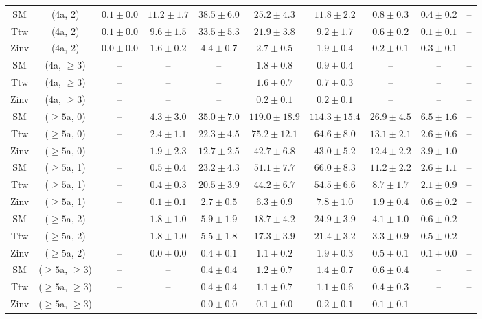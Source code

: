 \begin{table}[h!]
{\begin{tabular}{cccccccccc}
	SM & (4a, 2) & $0.1\pm 0.0$ & $11.2\pm 1.7$ & $38.5\pm 6.0$ & $25.2\pm 4.3$ & $11.8\pm 2.2$ & $0.8\pm 0.3$ & $0.4\pm 0.2$ & -- \\[0.5ex] 
	Ttw & (4a, 2) & $0.1\pm 0.0$ & $9.6\pm 1.5$ & $33.5\pm 5.3$ & $21.9\pm 3.8$ & $9.2\pm 1.7$ & $0.6\pm 0.2$ & $0.1\pm 0.1$ & -- \\[0.5ex] 
	Zinv & (4a, 2) & $0.0\pm 0.0$ & $1.6\pm 0.2$ & $4.4\pm 0.7$ & $2.7\pm 0.5$ & $1.9\pm 0.4$ & $0.2\pm 0.1$ & $0.3\pm 0.1$ & -- \\[0.5ex] 
	SM & (4a, $\ge3$) & -- & -- & -- & $1.8\pm 0.8$ & $0.9\pm 0.4$ & -- & -- & -- \\[0.5ex] 
	Ttw & (4a, $\ge3$) & -- & -- & -- & $1.6\pm 0.7$ & $0.7\pm 0.3$ & -- & -- & -- \\[0.5ex] 
	Zinv & (4a, $\ge3$) & -- & -- & -- & $0.2\pm 0.1$ & $0.2\pm 0.1$ & -- & -- & -- \\[0.5ex] 
	SM & ($\ge5$a, 0) & -- & $4.3\pm 3.0$ & $35.0\pm 7.0$ & $119.0\pm 18.9$ & $114.3\pm 15.4$ & $26.9\pm 4.5$ & $6.5\pm 1.6$ & -- \\[0.5ex] 
	Ttw & ($\ge5$a, 0) & -- & $2.4\pm 1.1$ & $22.3\pm 4.5$ & $75.2\pm 12.1$ & $64.6\pm 8.0$ & $13.1\pm 2.1$ & $2.6\pm 0.6$ & -- \\[0.5ex] 
	Zinv & ($\ge5$a, 0) & -- & $1.9\pm 2.3$ & $12.7\pm 2.5$ & $42.7\pm 6.8$ & $43.0\pm 5.2$ & $12.4\pm 2.2$ & $3.9\pm 1.0$ & -- \\[0.5ex] 
	SM & ($\ge5$a, 1) & -- & $0.5\pm 0.4$ & $23.2\pm 4.3$ & $51.1\pm 7.7$ & $66.0\pm 8.3$ & $11.2\pm 2.2$ & $2.6\pm 1.1$ & -- \\[0.5ex] 
	Ttw & ($\ge5$a, 1) & -- & $0.4\pm 0.3$ & $20.5\pm 3.9$ & $44.2\pm 6.7$ & $54.5\pm 6.6$ & $8.7\pm 1.7$ & $2.1\pm 0.9$ & -- \\[0.5ex] 
	Zinv & ($\ge5$a, 1) & -- & $0.1\pm 0.1$ & $2.7\pm 0.5$ & $6.3\pm 0.9$ & $7.8\pm 1.0$ & $1.9\pm 0.4$ & $0.6\pm 0.2$ & -- \\[0.5ex] 
	SM & ($\ge5$a, 2) & -- & $1.8\pm 1.0$ & $5.9\pm 1.9$ & $18.7\pm 4.2$ & $24.9\pm 3.9$ & $4.1\pm 1.0$ & $0.6\pm 0.2$ & -- \\[0.5ex] 
	Ttw & ($\ge5$a, 2) & -- & $1.8\pm 1.0$ & $5.5\pm 1.8$ & $17.3\pm 3.9$ & $21.4\pm 3.2$ & $3.3\pm 0.9$ & $0.5\pm 0.2$ & -- \\[0.5ex] 
	Zinv & ($\ge5$a, 2) & -- & $0.0\pm 0.0$ & $0.4\pm 0.1$ & $1.1\pm 0.2$ & $1.9\pm 0.3$ & $0.5\pm 0.1$ & $0.1\pm 0.0$ & -- \\[0.5ex] 
	SM & ($\ge5$a, $\ge3$) & -- & -- & $0.4\pm 0.4$ & $1.2\pm 0.7$ & $1.4\pm 0.7$ & $0.6\pm 0.4$ & -- & -- \\[0.5ex] 
	Ttw & ($\ge5$a, $\ge3$) & -- & -- & $0.4\pm 0.4$ & $1.1\pm 0.7$ & $1.1\pm 0.6$ & $0.4\pm 0.3$ & -- & -- \\[0.5ex] 
	Zinv & ($\ge5$a, $\ge3$) & -- & -- & $0.0\pm 0.0$ & $0.1\pm 0.0$ & $0.2\pm 0.1$ & $0.1\pm 0.1$ & -- & -- \\[0.5ex] 
	\hline
	\hline
\end{tabular}}
\end{table}
